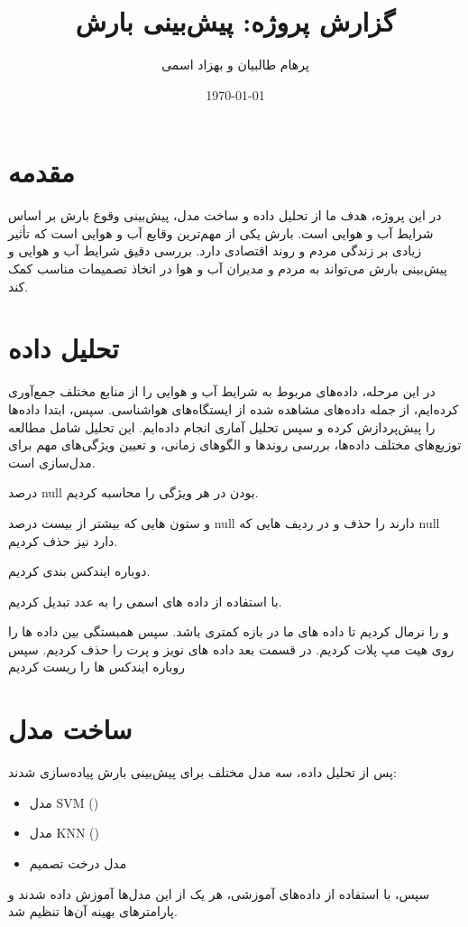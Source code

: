 \documentclass{article}
\title{گزارش پروژه: پیش‌بینی بارش}
\author{پرهام طالبیان و بهزاد اسمی}
\date{\today}
\begin{document}
	
	\maketitle
	
	\section{مقدمه}
	در این پروژه، هدف ما از تحلیل داده و ساخت مدل، پیش‌بینی وقوع بارش بر اساس شرایط آب و هوایی است. بارش یکی از مهم‌ترین وقایع آب و هوایی است که تأثیر زیادی بر زندگی مردم و روند اقتصادی دارد. بررسی دقیق شرایط آب و هوایی و پیش‌بینی بارش می‌تواند به مردم و مدیران آب و هوا در اتخاذ تصمیمات مناسب کمک کند.
	
	\section{تحلیل داده}
	در این مرحله، داده‌های مربوط به شرایط آب و هوایی را از منابع مختلف جمع‌آوری کرده‌ایم، از جمله داده‌های مشاهده شده از ایستگاه‌های هواشناسی. سپس، ابتدا داده‌ها را پیش‌پردازش کرده و سپس تحلیل آماری انجام داده‌ایم. این تحلیل شامل مطالعه توزیع‌های مختلف داده‌ها، بررسی روندها و الگوهای زمانی، و تعیین ویژگی‌های مهم برای مدل‌سازی است.

	

	
	
	

	

	درصد null بودن در هر ویژگی را محاسبه کردیم.
	
	

	و 
		ستون هایی که بیشتر از بیست درصد null دارند را حذف و در ردیف هایی که null دارد نیز حذف کردیم.
		
	


	  دوباره ایندکس بندی کردیم.
	 
	 

	 با استفاده از 
	 داده های اسمی را به عدد تبدیل کردیم.
	 
	 و 
	 را نرمال کردیم تا داده های ما در بازه کمتری باشد.
	 سپس همبستگی بین داده ها را روی هیت مپ پلات کردیم. در قسمت بعد داده های نویز و پرت را حذف کردیم.
	 سپس روباره ایندکس ها را ریست کردیم 
	 
	
	

	
	
		
		
		
		
	
	
	
	\section{ساخت مدل}
	پس از تحلیل داده، سه مدل مختلف برای پیش‌بینی بارش پیاده‌سازی شدند:
	\begin{itemize}
		\item مدل SVM ()
		\item مدل KNN ()
		\item مدل درخت تصمیم
	\end{itemize}
	سپس، با استفاده از داده‌های آموزشی، هر یک از این مدل‌ها آموزش داده شدند و پارامترهای بهینه آن‌ها تنظیم شد.
	
\end{document}
